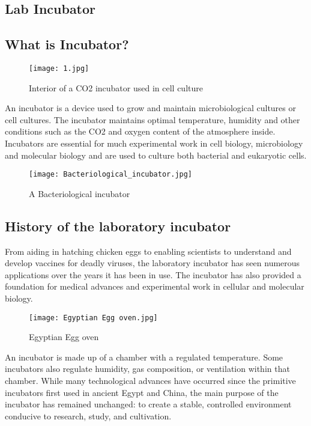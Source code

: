 \documentclass[11pt]{article}
\begin{document}
\begin{center}
\section{\textbf{\Huge Lab Incubator}}
\end{center}
\subsection{What is Incubator?}

\begin{figure}[h]
\centering
\texttt{[image: 1.jpg]}
\caption{Interior of a CO2 incubator used in cell culture}
\end{figure}

\setlength{\parskip}{0.01em}
\raggedright
An incubator is a device used to grow and maintain microbiological cultures or cell cultures. The incubator maintains optimal temperature, humidity and other conditions such as the CO2 and oxygen content of the atmosphere inside. Incubators are essential for much experimental work in cell biology, microbiology and molecular biology and are used to culture both bacterial and eukaryotic cells.
\begin{figure}[h]
\centering
\texttt{[image: Bacteriological\_incubator.jpg]}
\caption{A Bacteriological incubator}
\end{figure}
\raggedright
\subsection{History of the laboratory incubator}
\raggedright From aiding in hatching chicken eggs to enabling scientists to understand and develop vaccines for deadly viruses, the laboratory incubator has seen numerous applications over the years it has been in use. The incubator has also provided a foundation for medical advances and experimental work in cellular and molecular biology.

\begin{figure}[h]
\centering
\texttt{[image: Egyptian Egg oven.jpg]}
\caption{Egyptian Egg oven}
\end{figure}
\raggedright An incubator is made up of a chamber with a regulated temperature. Some incubators also regulate humidity, gas composition, or ventilation within that chamber. While many technological advances have occurred since the primitive incubators first used in ancient Egypt and China, the main purpose of the incubator has remained unchanged: to create a stable, controlled environment conducive to research, study, and cultivation.
\raggedright
\end{document}
